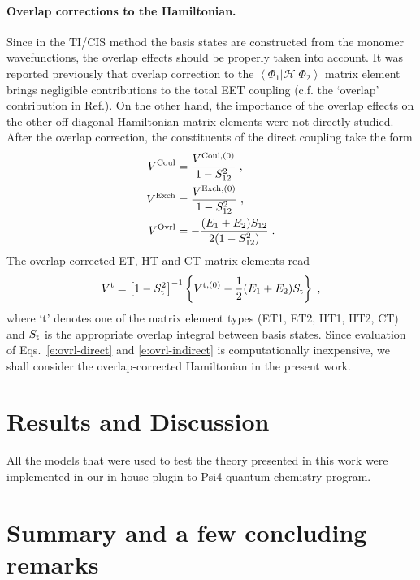 \paragraph*{Overlap corrections to the Hamiltonian.}
Since in the TI/CIS method the basis states are constructed from the monomer wavefunctions,
the overlap effects should be properly taken into account. It was reported previously
that overlap correction to the $\left< \Phi_1 \vert \mathscr{H} \vert \Phi_2 \right>$ 
matrix element brings negligible contributions to the 
total EET coupling (c.f. the `overlap' contribution in Ref.). On the other hand,
the importance of the overlap effects on the other off\hyp{}diagonal Hamiltonian matrix elements were not directly studied. 
After the overlap correction, the constituents of the direct coupling take the form
%
\begin{subequations}\label{e:ovrl-direct}
\begin{align}
 V^{\rm Coul} &= \frac{V^{{\rm Coul},(0)}}{1 - S_{12}^2} \;, \\
 V^{\rm Exch} &= \frac{V^{{\rm Exch},(0)}}{1 - S_{12}^2} \;, \\
 V^{\rm Ovrl} &=-\frac{(E_1+E_2)S_{12}}{2(1-S_{12}^2)}   \;.
\end{align}
\end{subequations}
%
The overlap\hyp{}corrected ET, HT and CT matrix elements read
%
\begin{equation}\label{e:ovrl-indirect}
 V^{\rm t} = \left[ 1 - S_{\rm t}^2 \right]^{-1} \left\{ V^{{\rm t},(0)} - \frac{1}{2} (E_1+E_2) S_{\rm t} \right\} \;,
\end{equation}
%
where `t' denotes one of the matrix element types (ET1, ET2, HT1, HT2, CT) 
and $S_{\rm t}$ is the appropriate overlap integral between basis states.
Since evaluation
of Eqs.~\eqref{e:ovrl-direct} and \eqref{e:ovrl-indirect} 
is computationally inexpensive, we shall consider the overlap\hyp{}corrected
Hamiltonian in the present work.


\section{\label{s:4}Results and Discussion}

All the models that were used to test the theory presented in this work
were implemented in our in\hyp{}house plugin to {\sc Psi4} quantum chemistry program.\cite{Psi4.JCTC.2017}


\section{\label{s:5}Summary and a few concluding remarks}

